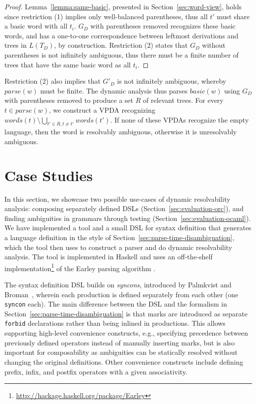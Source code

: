\documentclass[runningheads]{llncs}
\newcommand{\syncon}{\lstinline[language=syncon]}
\newcommand{\parse}{\mathit{parse}} %
\newcommand{\words}{\mathit{words}} %
\newcommand{\alt}{\mathit{alt}} %
\newcommand{\basic}{\mathit{basic}} %
\begin{document}
\begin{proof}
  Lemma~\ref{lemma:same-basic}, presented in Section~\ref{sec:word-view}, holds since restriction (1) implies only well-balanced parentheses, thus all $t'$ must share a basic word with all $t_i$. $G_D$ with parentheses removed recognizes these basic words, and has a one-to-one correspondence between leftmost derivations and trees in $L(T_D)$, by construction. Restriction (2) states that $G_D$ without parentheses is not infinitely ambiguous, thus there must be a finite number of trees that have the same basic word as all $t_i$.
\end{proof}

Restriction (2) also implies that $G'_D$ is not infinitely ambiguous, whereby $\parse(w)$ must be finite. The dynamic analysis thus parses $\basic(w)$ using $G_D$ with parentheses removed to produce a set $R$ of relevant trees. For every $t \in parse(w)$, we construct a VPDA recognizing $\words(t) \setminus \bigcup_{t' \in R, t \neq t'}\words(t')$. If none of these VPDAs recognize the empty language, then the word is resolvably ambiguous, otherwise it is unresolvably ambiguous.

\section{Case Studies} \label{sec:evaluation}

In this section, we showcase two possible use-cases of dynamic
resolvability analysis: composing separately defined DSLs
(Section~\ref{sec:evaluation-orc}), and finding ambiguities in
grammars through testing (Section~\ref{sec:evaluation-ocaml}).
%
We have implemented a tool and a small DSL for syntax definition
that generates a language definition in the style of
Section~\ref{sec:parse-time-disambiguation}, which the tool then
uses to construct a parser and do dynamic resolvability analysis.
The tool is implemented in Haskell and uses an off-the-shelf
implementation\footnote{\url{http://hackage.haskell.org/package/Earley}}
of the Earley parsing algorithm
\cite{earleyEfficientContextfreeParsing1970}.

The syntax definition DSL builds on \emph{syncons}, introduced by
Palmkvist and Broman~\cite{palmkvistCreatingDomainSpecificLanguages2019}, wherein each
production is defined separately from each other (one
\syncon{syncon} each).
%
The main difference between the DSL and the formalism in
Section~\ref{sec:parse-time-disambiguation} is that marks are
introduced as separate \syncon{forbid} declarations rather than
being inlined in productions. This allows supporting high-level
convenience constructs, e.g., specifying precedence between
previously defined operators instead of manually inserting marks,
but is also important for composability as ambiguities can be
statically resolved without changing the original definitions.
Other convenience constructs include defining prefix, infix, and
postfix operators with a given associativity.
\end{document}
